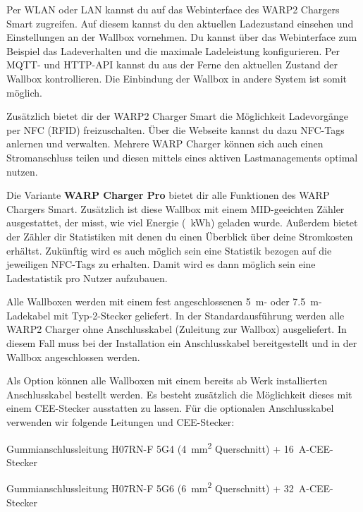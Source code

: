 \documentclass[a4paper,10pt]{article}
\begin{document}
\begin{multicols*}{2}
	Per WLAN oder LAN kannst du auf das Webinterface des WARP2 Chargers Smart
	zugreifen. Auf diesem kannst du den aktuellen Ladezustand einsehen und
	Einstellungen an der Wallbox vornehmen. Du kannst über das Webinterface
	zum Beispiel das Ladeverhalten und die maximale Ladeleistung konfigurieren.
	Per MQTT- und HTTP-API kannst du aus der Ferne den aktuellen Zustand
	der Wallbox kontrollieren. Die Einbindung der Wallbox in andere System ist somit möglich.

	Zusätzlich bietet dir der WARP2 Charger Smart die Möglichkeit Ladevorgänge
	per NFC (RFID) freizuschalten. Über die Webseite kannst du dazu NFC-Tags
	anlernen und verwalten. Mehrere WARP Charger können sich auch einen
	Stromanschluss teilen und diesen mittels eines aktiven Lastmanagements optimal
	nutzen.

	Die Variante \textbf{WARP Charger Pro} bietet dir alle Funktionen des WARP Chargers Smart.
	Zusätzlich ist diese Wallbox mit einem MID-geeichten Zähler
	ausgestattet, der misst, wie viel Energie (\SI{}{\kWh}) geladen
	wurde. Außerdem bietet der Zähler dir Statistiken mit denen du einen Überblick über deine
	Stromkosten erhältst. Zukünftig wird es auch möglich sein eine Statistik
	bezogen auf die jeweiligen NFC-Tags zu erhalten. Damit wird es dann möglich
	sein eine Ladestatistik pro Nutzer aufzubauen.

	Alle Wallboxen werden mit einem fest angeschlossenen
	\SI{5}{\meter}- oder \SI{7,5}{\meter}-Ladekabel mit Typ-2-Stecker geliefert.
	In der Standardausführung werden alle WARP2 Charger ohne Anschlusskabel
	(Zuleitung zur Wallbox) ausgeliefert. In diesem Fall muss bei der Installation
	ein Anschlusskabel bereitgestellt und in der Wallbox angeschlossen werden.

	Als Option können alle Wallboxen mit einem bereits ab Werk
	installierten Anschlusskabel bestellt werden. Es besteht zusätzlich die
	Möglichkeit dieses mit einem CEE-Stecker ausstatten zu lassen.
	Für die optionalen Anschluss\-kabel verwenden wir folgende Leitungen und CEE-Stecker:

	\begin{description}[leftmargin=!,labelwidth=\widthof{\textbf{\SI{22}{\kilo\watt}}}]
		\item[\SI{11}{\kilo\watt}]Gummianschlussleitung H07RN-F 5G4
		      (\SI{4}{\square\milli\meter}
		      Querschnitt) + \SI{16}{\ampere}-CEE-Stecker
		\item[\SI{22}{\kilo\watt}]Gummianschlussleitung H07RN-F 5G6
		      (\SI{6}{\square\milli\meter}
		      Querschnitt) + \SI{32}{\ampere}-CEE-Stecker
	\end{description}


\end{multicols*}
\end{document}
